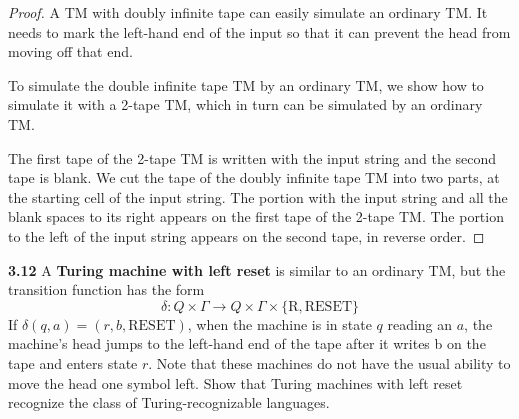\begin{mdframed}
\begin{proof}
A TM with doubly infinite tape can easily simulate an ordinary TM. It needs to mark the left-hand end of the input so that it can prevent the head from moving off that end.

\medskip
To simulate the double infinite tape TM by an ordinary TM, we show how to simulate it with a 2-tape TM, which in turn can be simulated by an ordinary TM. 

The first tape of the 2-tape TM is written with the input string and the second tape is blank. We cut the tape of the doubly infinite tape TM into two parts, at the starting cell of the input string. The portion with the input string and all the blank spaces to its right appears on the first tape of the 2-tape TM. The portion to the left of the input string appears on the second tape, in reverse order.
\end{proof}
\end{mdframed}

\textbf{3.12} A \textbf{Turing machine with left reset} is similar to an ordinary TM, but the transition function has the form
\[
\delta: Q \times \Gamma \rightarrow Q \times \Gamma \times \{\text{R},\text{RESET} \}
\]
If $\delta(q,a) = (r, b, \text{RESET})$, when the machine is in state $q$ reading an $a$, the machine’s head jumps to the left-hand end of the tape after it writes b on the tape and enters state $r$. Note that these machines do not have the usual ability to move the head one symbol left. Show that Turing machines with left reset recognize the class of Turing-recognizable languages.

